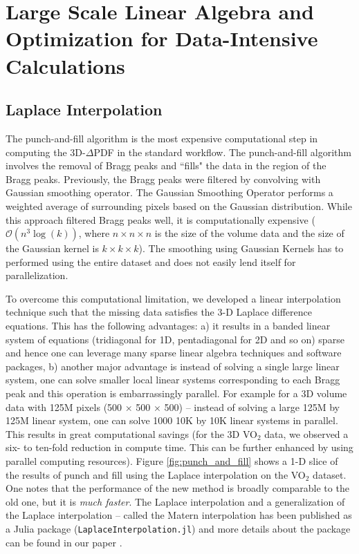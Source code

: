 \section{Large Scale Linear Algebra and Optimization for Data-Intensive Calculations}

\subsection{Laplace Interpolation} \label{ss:laplace}
The punch-and-fill algorithm is the most expensive computational step in computing the 3D-$\Delta$PDF in the standard workflow. The punch-and-fill algorithm involves the removal of Bragg peaks and ``fills" the data in the region of the Bragg peaks. Previously, the Bragg peaks were filtered by convolving with Gaussian smoothing operator. The Gaussian Smoothing Operator performs a weighted average of surrounding pixels based on the Gaussian distribution. While this approach filtered Bragg peaks well, it is computationally expensive ($\mathcal{O}(n^3 \log(k))$, where $n\times n \times n $ is the size of the volume data and the size of the Gaussian kernel is $k \times k \times k$). The smoothing using Gaussian Kernels has to performed using the entire dataset and does not easily lend itself for parallelization. 

To overcome this computational limitation, we developed a linear interpolation technique such that the missing data satisfies the 3-D Laplace difference equations. This has the following advantages: a) it results in a banded linear system of equations (tridiagonal for 1D, pentadiagonal for 2D and so on) sparse and hence one can leverage many sparse linear algebra techniques and software packages, b) another major advantage is instead of solving a single large linear system, one can solve smaller local linear systems corresponding to each Bragg peak and this operation is embarrassingly parallel. For example for a 3D volume data with 125M pixels (500 $\times$ 500 $\times$ 500) -- instead of solving a large 125M by 125M linear system, one can solve 1000 10K by 10K linear systems in parallel. This results in great computational savings (for the 3D VO$_2$ data, we observed a six- to ten-fold reduction in compute time. This can be further enhanced by using parallel computing resources). Figure \ref{fig:punch_and_fill} shows a 1-D slice of the results of punch and fill using the Laplace interpolation on the VO$_2$ dataset. One notes that the performance of the new method is broadly comparable to the old one, but it is \textit{much faster}. The Laplace interpolation and a generalization of the Laplace interpolation -- called the Matern interpolation has been published as a Julia package (\texttt{LaplaceInterpolation.jl}) and more details about the package can be found in our paper \cite{RH2022}.


